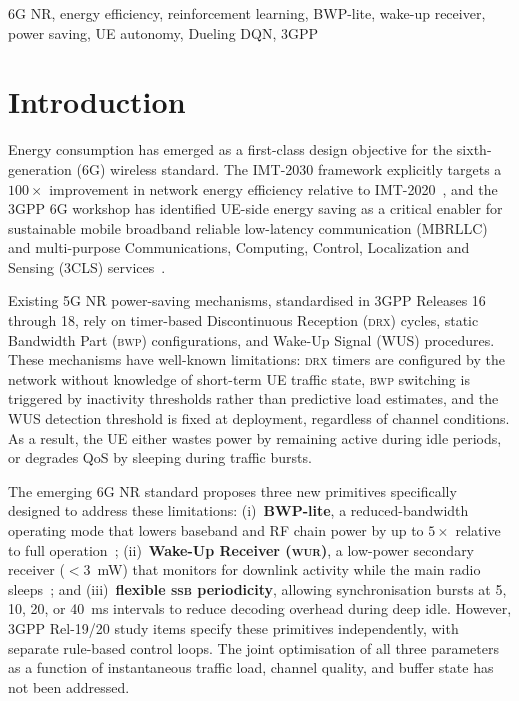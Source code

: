 \documentclass[conference]{IEEEtran}
\newcommand{\bwp}{\textsc{bwp}}
\newcommand{\wur}{\textsc{wur}}
\newcommand{\ssb}{\textsc{ssb}}
\newcommand{\drx}{\textsc{drx}}
\begin{document}
\begin{IEEEkeywords}
6G NR, energy efficiency, reinforcement learning, BWP-lite, wake-up
receiver, power saving, UE autonomy, Dueling DQN, 3GPP
\end{IEEEkeywords}

\section{Introduction}
\label{sec:intro}

Energy consumption has emerged as a first-class design objective for the
sixth-generation (6G) wireless standard.
The IMT-2030 framework explicitly targets a $100\times$ improvement in
network energy efficiency relative to IMT-2020~\cite{itu_imt2030},
and the 3GPP 6G workshop has identified UE-side energy saving as a
critical enabler for sustainable mobile broadband reliable low-latency
communication (MBRLLC) and multi-purpose Communications, Computing,
Control, Localization and Sensing (3CLS) services~\cite{3gpp_6g_workshop}.

Existing 5G NR power-saving mechanisms, standardised in 3GPP Releases 16
through 18, rely on timer-based Discontinuous Reception (\drx{}) cycles,
static Bandwidth Part (\bwp{}) configurations, and Wake-Up Signal (WUS)
procedures.
These mechanisms have well-known limitations: \drx{} timers are configured
by the network without knowledge of short-term UE traffic state,
\bwp{} switching is triggered by inactivity thresholds rather than
predictive load estimates, and the WUS detection threshold is fixed at
deployment, regardless of channel conditions.
As a result, the UE either wastes power by remaining active during idle
periods, or degrades QoS by sleeping during traffic bursts.

The emerging 6G NR standard proposes three new primitives specifically
designed to address these limitations:
(i)~\textbf{BWP-lite}, a reduced-bandwidth operating mode that lowers
baseband and RF chain power by up to $5\times$ relative to full
operation~\cite{qualcomm_6g_proposals};
(ii)~\textbf{Wake-Up Receiver (\wur{})}, a low-power secondary receiver
($<$3~mW) that monitors for downlink activity while the main radio
sleeps~\cite{3gpp_tr38875};
and (iii)~\textbf{flexible \ssb{} periodicity}, allowing synchronisation
bursts at 5, 10, 20, or 40~ms intervals to reduce decoding overhead
during deep idle.
However, 3GPP Rel-19/20 study items specify these primitives
independently, with separate rule-based control loops.
The joint optimisation of all three parameters as a function of
instantaneous traffic load, channel quality, and buffer state has not
been addressed.
\end{document}
